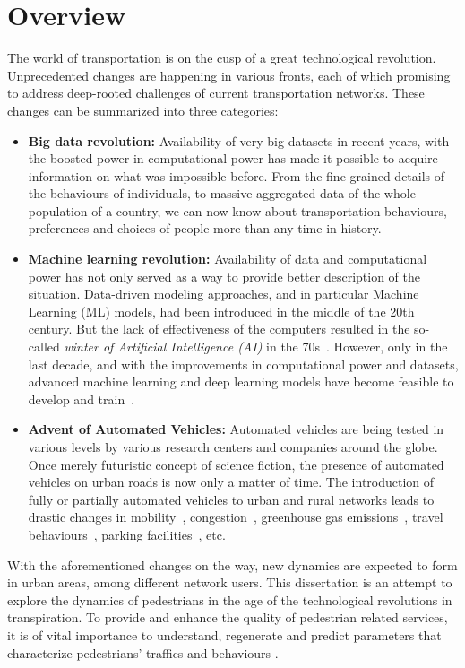 \chapter{Overview}\label{ch:over}
The world of transportation is on the cusp of a great technological revolution. Unprecedented changes are happening in various fronts, each of which promising to address deep-rooted challenges of current transportation networks. These changes can be summarized into three categories:
\begin{itemize}
    \item \textbf{Big data revolution:} Availability of very big datasets in recent years, with the boosted power in computational power has made it possible to acquire information on what was impossible before. From the fine-grained details of the behaviours of individuals, to massive aggregated data of the whole population of a country, we can now know about transportation behaviours, preferences and choices of people more than any time in history.
    \item\textbf{\textbf{Machine learning revolution:}} Availability of data and computational power has not only served as a way to provide better description of the situation. Data-driven modeling approaches, and in particular Machine Learning (ML) models, had been introduced in the middle of the 20th century. But the lack of effectiveness of the computers resulted in the so-called \textit{winter of Artificial Intelligence (AI)} in the 70s~\cite{russell2002artificial}. However, only in the last decade, and with the improvements in computational power and datasets, advanced machine learning and deep learning models have become feasible to develop and train~\cite{Goodfellow-et-al-2016}.
    \item\textbf{Advent of Automated Vehicles:} Automated vehicles are being tested in various levels by various research centers and companies around the globe. Once merely futuristic concept of science fiction, the presence of automated vehicles on urban roads is now only a matter of time. The introduction of fully or partially automated vehicles to urban and rural networks leads to drastic changes in mobility~\cite{angerholzer2017autonomous}, congestion~\cite{djavadian2020multi}, greenhouse gas emissions~\cite{greenblatt2015autonomous}, travel behaviours~\cite{farooq2018virtual}, parking facilities~\cite{bahrami2019impacts}, etc. 
\end{itemize}
With the aforementioned changes on the way, new dynamics are expected to form in urban areas, among different network users. This dissertation is an attempt to explore the dynamics of pedestrians in the age of the technological revolutions in transpiration. To provide and enhance the quality of pedestrian related services, it is of vital importance to understand, regenerate and predict parameters that characterize pedestrians' traffics and behaviours \cite{nikolic2016probabilistic}. 

